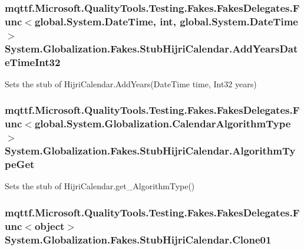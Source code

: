 \hypertarget{class_system_1_1_globalization_1_1_fakes_1_1_stub_hijri_calendar_af3ecafb30c1542acfe82efbb0b373e38}{
\subsubsection[{Add\-Years\-Date\-Time\-Int32}]{\setlength{\rightskip}{0pt plus 5cm}mqttf.\-Microsoft.\-Quality\-Tools.\-Testing.\-Fakes.\-Fakes\-Delegates.\-Func$<$global.\-System.\-Date\-Time, int, global.\-System.\-Date\-Time$>$ System.\-Globalization.\-Fakes.\-Stub\-Hijri\-Calendar.\-Add\-Years\-Date\-Time\-Int32}}\label{class_system_1_1_globalization_1_1_fakes_1_1_stub_hijri_calendar_af3ecafb30c1542acfe82efbb0b373e38}


Sets the stub of Hijri\-Calendar.\-Add\-Years(\-Date\-Time time, Int32 years)

\hypertarget{class_system_1_1_globalization_1_1_fakes_1_1_stub_hijri_calendar_ab7b0cb538fc8f466580b3a7c6b8d012b}{
\subsubsection[{Algorithm\-Type\-Get}]{\setlength{\rightskip}{0pt plus 5cm}mqttf.\-Microsoft.\-Quality\-Tools.\-Testing.\-Fakes.\-Fakes\-Delegates.\-Func$<$global.\-System.\-Globalization.\-Calendar\-Algorithm\-Type$>$ System.\-Globalization.\-Fakes.\-Stub\-Hijri\-Calendar.\-Algorithm\-Type\-Get}}\label{class_system_1_1_globalization_1_1_fakes_1_1_stub_hijri_calendar_ab7b0cb538fc8f466580b3a7c6b8d012b}


Sets the stub of Hijri\-Calendar.\-get\-\_\-\-Algorithm\-Type()

\hypertarget{class_system_1_1_globalization_1_1_fakes_1_1_stub_hijri_calendar_a868577aac9b61ba12aa7e8b34776b457}{
\subsubsection[{Clone01}]{\setlength{\rightskip}{0pt plus 5cm}mqttf.\-Microsoft.\-Quality\-Tools.\-Testing.\-Fakes.\-Fakes\-Delegates.\-Func$<$object$>$ System.\-Globalization.\-Fakes.\-Stub\-Hijri\-Calendar.\-Clone01}}\label{class_system_1_1_globalization_1_1_fakes_1_1_stub_hijri_calendar_a868577aac9b61ba12aa7e8b34776b457}


